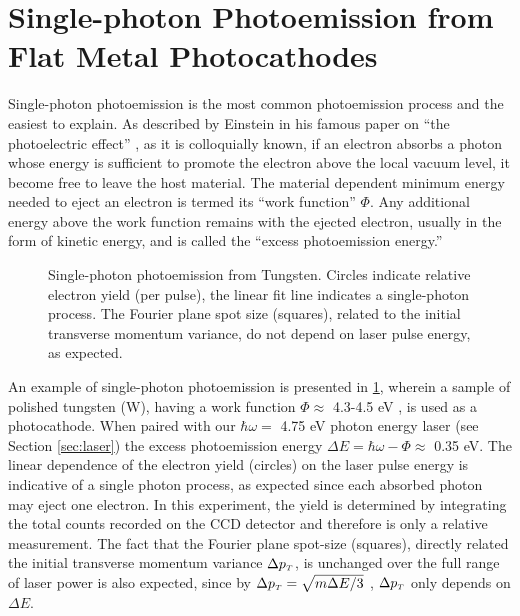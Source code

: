 
\section{Single-photon Photoemission from Flat Metal Photocathodes}

Single-photon photoemission is the most common photoemission process and the easiest to explain.
As described by Einstein in his famous paper on ``the photoelectric effect'' \cite{einstein_uber_1905}, as it is colloquially known, if an electron absorbs a photon whose energy is sufficient to promote the electron above the local vacuum level, it become free to leave the host material.
The material dependent minimum energy needed to eject an electron is termed its ``work function'' $\Phi$.
Any additional energy above the work function remains with the ejected electron, usually in the form of kinetic energy, and is called the ``excess photoemission energy.''

\begin{figure}
  \centering
  
  \caption[Single-photon photoemission from Tungsten]{
    Single-photon photoemission from Tungsten.
    Circles indicate relative electron yield (per pulse), the linear fit line indicates a single-photon process.
    The Fourier plane spot size (squares), related to the initial transverse momentum variance, do not depend on laser pulse energy, as expected.
  }
  \label{fig:single_photon_tungsten}
\end{figure}

An example of single-photon photoemission is presented in \ref{fig:single_photon_tungsten}, wherein a sample of polished tungsten (W), having a work function $\Phi \approx $ 4.3-4.5 eV \cite{yen_thermally_1980}, is used as a photocathode.
When paired with our $\hbar \omega = $ 4.75 eV photon energy laser (see Section \ref{sec:laser}) the excess photoemission energy $\Delta E = \hbar \omega - \Phi \approx $ 0.35 eV.
The linear dependence of the electron yield (circles) on the laser pulse energy is indicative of a single photon process, as expected since each absorbed photon may eject one electron.
In this experiment, the yield is determined by integrating the total counts recorded on the CCD detector and therefore is only a relative measurement.
The fact that the Fourier plane spot-size (squares), directly related the initial transverse momentum variance $\Delta p_{{\scriptscriptstyle T}}$, is unchanged over the full range of laser power is also expected, since by $\Delta p_{{\scriptscriptstyle T}} = \sqrt{ m \Delta E / 3 } $ \cite{dowell_quantum_2009}, $\Delta p_{{\scriptscriptstyle T}}$ only depends on $\Delta E$.

